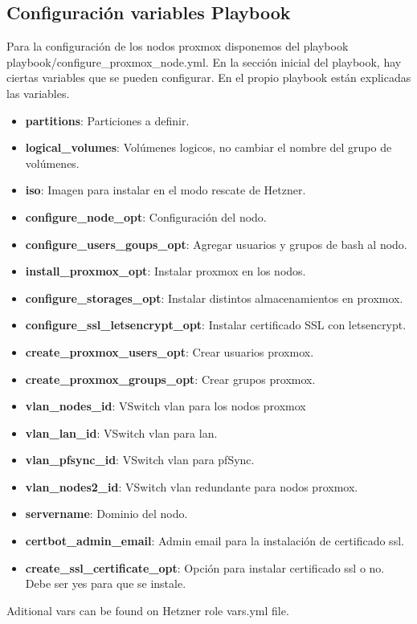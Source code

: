		\subsection{Configuración variables Playbook}
		\begin{paragraph}
			Para la configuración de los nodos proxmox disponemos del playbook playbook/configure\_proxmox\_node.yml.
			En la sección inicial del playbook, hay ciertas variables que se pueden configurar. En el propio playbook están explicadas las variables.
			\begin{itemize}
				\item \textbf{partitions}: Particiones a definir. 
				\item \textbf{logical\_volumes}: Volúmenes logicos, no cambiar el nombre del grupo de volúmenes.
				\item \textbf{iso}: Imagen para instalar en el modo rescate de Hetzner.
				\item \textbf{configure\_node\_opt}: Configuración del nodo.
				\item \textbf{configure\_users\_goups\_opt}: Agregar usuarios y grupos de bash al nodo.
				\item \textbf{install\_proxmox\_opt}: Instalar proxmox en los nodos.
				\item \textbf{configure\_storages\_opt}: Instalar distintos almacenamientos en proxmox.
				\item \textbf{configure\_ssl\_letsencrypt\_opt}: Instalar certificado SSL con letsencrypt.
				\item \textbf{create\_proxmox\_users\_opt}: Crear usuarios proxmox.
				\item \textbf{create\_proxmox\_groups\_opt}: Crear grupos proxmox.
				\item \textbf{vlan\_nodes\_id}: VSwitch vlan para los nodos proxmox
				\item \textbf{vlan\_lan\_id}: VSwitch vlan para lan.
				\item \textbf{vlan\_pfsync\_id}: VSwitch vlan para pfSync.
				\item \textbf{vlan\_nodes2\_id}: VSwitch vlan redundante para nodos proxmox.
				\item \textbf{servername}: Dominio del nodo.
				\item \textbf{certbot\_admin\_email}: Admin email para la instalación de certificado ssl.
				\item \textbf{create\_ssl\_certificate\_opt}: Opción para instalar certificado ssl o no. Debe ser yes para que se instale.
			\end{itemize}
	
			Aditional vars can be found on Hetzner role vars.yml file.
		\end{paragraph}
